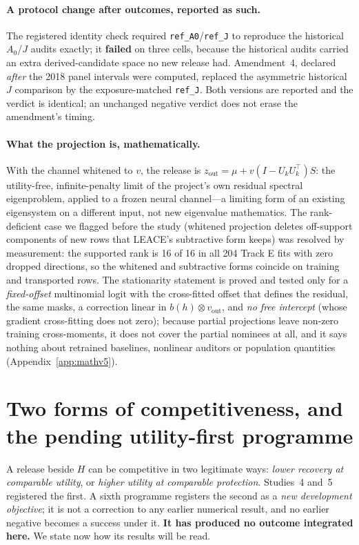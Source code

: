 \documentclass[10pt]{article}
\begin{document}
\paragraph{A protocol change after outcomes, reported as such.} The registered identity check required
\texttt{ref\_A0}/\texttt{ref\_J} to reproduce the historical $A_0$/$J$ audits exactly; it \textbf{failed} on
three cells, because the historical audits carried an extra derived-candidate space no new release had.
Amendment~4, declared \emph{after} the 2018 panel intervals were computed, replaced the asymmetric historical
$J$ comparison by the exposure-matched \texttt{ref\_J}. Both versions are reported and the verdict is identical;
an unchanged negative verdict does not erase the amendment's timing.

\paragraph{What the projection is, mathematically.} With the channel whitened to $v$, the release is
$z_{\mathrm{out}}=\mu+v(I-U_kU_k^\top)S$: the utility-free, infinite-penalty limit of the project's own
residual spectral eigenproblem, applied to a frozen neural channel---a limiting form of an existing
eigensystem on a different input, not new eigenvalue mathematics. The rank-deficient case we flagged before
the study (whitened projection deletes off-support components of new rows that LEACE's subtractive form keeps)
was resolved by measurement: the supported rank is 16 of 16 in all 204 Track E fits with zero dropped
directions, so the whitened and subtractive forms coincide on training and transported rows. The
stationarity statement is proved and tested only for a \emph{fixed-offset} multinomial logit with the
cross-fitted offset that defines the residual, the same masks, a correction linear in $b(h)\otimes
v_{\mathrm{out}}$, and \emph{no free intercept} (whose gradient cross-fitting does not zero); because partial projections leave non-zero
training cross-moments, it does not cover the partial nominees at all, and it says nothing about retrained
baselines, nonlinear auditors or population quantities (Appendix~\ref{app:mathv5}).

\section{Two forms of competitiveness, and the pending utility-first programme}
\label{sec:pending}

A release beside $H$ can be competitive in two legitimate ways: \emph{lower recovery at comparable utility},
or \emph{higher utility at comparable protection}. Studies~4 and~5 registered the first. A sixth programme
registers the second as a \emph{new development objective}; it is not a correction to any earlier numerical
result, and no earlier negative becomes a success under it. \textbf{It has produced no outcome integrated
here.} We state now how its results will be read.
\end{document}
